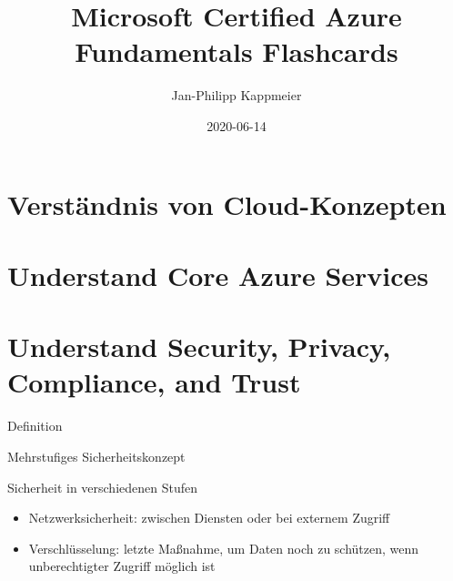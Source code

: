 \documentclass{scrartcl}
\newenvironment{flashcard}[2][]{%
    #1
    \vfill
    \centerline{\Large{#2}}
    \vfill
\newpage
}
{\newpage}
\newcommand{\sectioncard}[1]{
    \vspace*{\stretch{1}}
    \section{#1}
    \vspace*{\stretch{1}}
    \pagebreak
}
\begin{document}
    \title{Microsoft Certified Azure Fundamentals Flashcards}
    \date{2020-06-14}
    \author{Jan-Philipp Kappmeier}

    \clearpage\maketitle
    \thispagestyle{empty}
    \pagebreak

    \sectioncard{Verständnis von Cloud-Konzepten}

    
    
    

    

    \sectioncard{Understand Core Azure Services}

    

    

    

    

    \sectioncard{Understand Security, Privacy, Compliance, and Trust}

    \begin{flashcard}[Definition]{Mehrstufiges Sicherheitskonzept}
        Sicherheit in verschiedenen Stufen
        \begin{itemize}
            \item Netzwerksicherheit: zwischen Diensten oder bei externem Zugriff
            \item Verschlüsselung: letzte Maßnahme, um Daten noch zu schützen, wenn unberechtigter Zugriff möglich ist
        \end{itemize}
    \end{flashcard}

    
\end{document}
